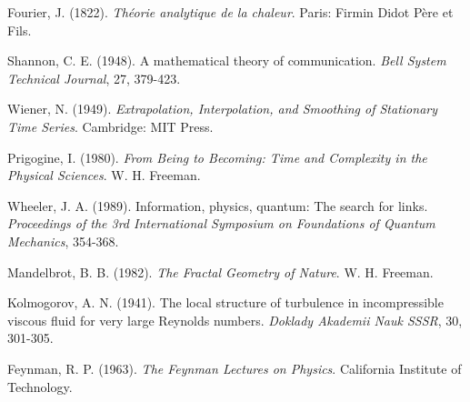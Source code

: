 \documentclass[12pt,a4paper]{article}
\begin{document}
\begin{thebibliography}{99}

Fourier, J. (1822). \textit{Théorie analytique de la chaleur}. Paris: Firmin Didot Père et Fils.

Shannon, C. E. (1948). A mathematical theory of communication. \textit{Bell System Technical Journal}, 27, 379-423.

Wiener, N. (1949). \textit{Extrapolation, Interpolation, and Smoothing of Stationary Time Series}. Cambridge: MIT Press.

Prigogine, I. (1980). \textit{From Being to Becoming: Time and Complexity in the Physical Sciences}. W. H. Freeman.

Wheeler, J. A. (1989). Information, physics, quantum: The search for links. \textit{Proceedings of the 3rd International Symposium on Foundations of Quantum Mechanics}, 354-368.

Mandelbrot, B. B. (1982). \textit{The Fractal Geometry of Nature}. W. H. Freeman.

Kolmogorov, A. N. (1941). The local structure of turbulence in incompressible viscous fluid for very large Reynolds numbers. \textit{Doklady Akademii Nauk SSSR}, 30, 301-305.

Feynman, R. P. (1963). \textit{The Feynman Lectures on Physics}. California Institute of Technology.

\end{thebibliography}
\end{document}
